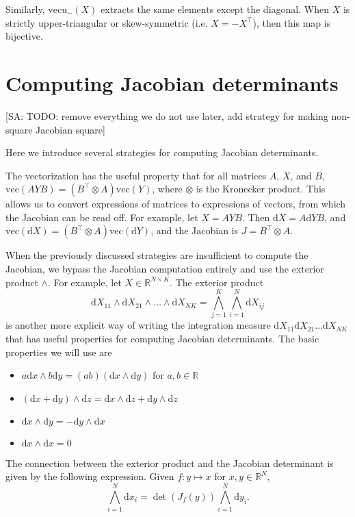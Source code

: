 \documentclass[11pt]{article}
\newcommand{\dv}[1]{\mathrm{d}{#1}}
\newcommand{\vect}{\mathrm{vec}}
\newcommand{\vectu}{\mathrm{vecu}}
\begin{document}
Similarly, $\vectu_-(X)$ extracts the same elements except the diagonal.
When $X$ is strictly upper-triangular or skew-symmetric (i.e. $X = -X^\top$), then this map is bijective.

\section{Computing Jacobian determinants}

[SA: TODO: remove everything we do not use later, add strategy for making non-square Jacobian square]

Here we introduce several strategies for computing Jacobian determinants.

The vectorization has the useful property that for all matrices $A$, $X$, and $B$, $\vect(AYB) = (B^\top \otimes A) \vect(Y)$, where $\otimes$ is the Kronecker product.
This allows us to convert expressions of matrices to expressions of vectors, from which the Jacobian can be read off.
For example, let $X = AYB$. Then $\dv{X} = A \dv{Y} B$, and $\vect(\dv{X}) = (B^\top \otimes A) \vect(\dv{Y})$, and the Jacobian is $J = B^\top \otimes A$.

When the previously discussed strategies are insufficient to compute the Jacobian, we bypass the Jacobian computation entirely and use the exterior product $\wedge$.
For example, let $X \in \mathbb{R}^{N \times K}$.
The exterior product
\[
  \dv{X_{11} }\wedge \dv{X_{21}} \wedge \ldots \wedge \dv{X_{NK}} = \bigwedge_{j=1}^K \bigwedge_{i=1}^N \dv{X}_{ij}
\]
is another more explicit way of writing the integration measure $\dv{X_{11}} \dv{X_{21}} \dots \dv{X_{NK}}$ that has useful properties for computing Jacobian determinants.
The basic properties we will use are

\begin{itemize}
  \item $a\dv{x} \wedge b\dv{y} = (ab)(\dv{x} \wedge \dv{y})$ for $a,b \in \mathbb{R}$
  \item $(\dv{x} + \dv{y}) \wedge \dv{z} = \dv{x} \wedge \dv{z} + \dv{y} \wedge \dv{z}$
  \item $\dv{x} \wedge \dv{y} = - \dv{y} \wedge \dv{x}$
  \item $\dv{x} \wedge \dv{x} = 0$
\end{itemize}

The connection between the exterior product and the Jacobian determinant is given by the following expression.
Given $f: y \mapsto x$ for $x,y \in \mathbb{R}^N$,
\[\bigwedge_{i=1}^N \dv{x_i} = \det(J_f(y)) \bigwedge_{i=1}^N \dv{y_i}.\]
\end{document}

